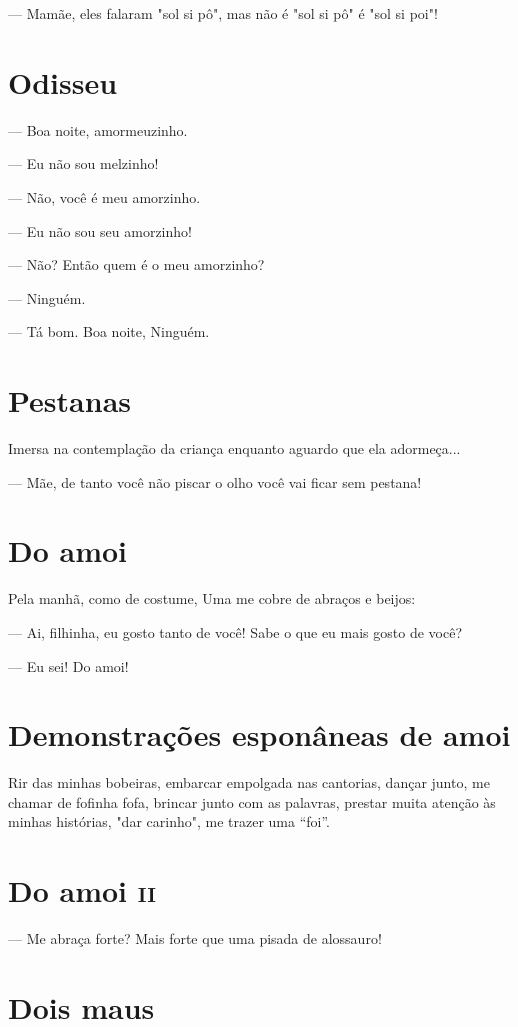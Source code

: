 {— Mamãe, eles falaram "sol si pô", mas não é "sol si pô" é "sol si poi"!

\chapter{Odisseu}

— Boa noite, amormeuzinho.

— Eu não sou melzinho!

— Não, você é meu amorzinho.

— Eu não sou seu amorzinho!

— Não? Então quem é o meu amorzinho?

— Ninguém.

— Tá bom. Boa noite, Ninguém.

\chapter{Pestanas}

Imersa na contemplação da criança enquanto aguardo que ela adormeça...

— Mãe, de tanto você não piscar o olho você vai ficar sem pestana!

\chapter{Do amoi}

Pela manhã, como de costume, Uma me cobre de abraços e beijos:

— Ai, filhinha, eu gosto tanto de você! Sabe o que eu mais gosto de
você?

— Eu sei! Do amoi!

\chapter{Demonstrações esponâneas de amoi}

Rir das minhas bobeiras, embarcar empolgada nas cantorias, dançar junto,
me chamar de fofinha fofa, brincar junto com as palavras, prestar muita
atenção às minhas histórias, "dar carinho", me trazer uma ``foi''.

\chapter{Do amoi \textsc{ii}}

— Me abraça forte? Mais forte que uma pisada de alossauro!

\chapter{Dois maus}

}
